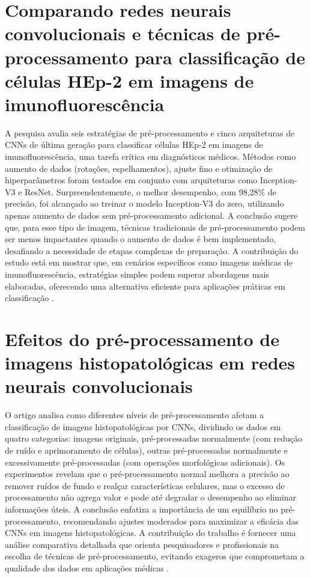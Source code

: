 \section{Comparando redes neurais convolucionais e técnicas de pré- processamento para classificação de células HEp-2 em imagens de imunofluorescência}
A pesquisa avalia seis estratégias de pré-processamento e cinco arquiteturas de CNNs de última geração para classificar células HEp-2 em imagens de imunofluorescência, uma tarefa crítica em diagnósticos médicos. Métodos como aumento de dados (rotações, espelhamentos), ajuste fino e otimização de hiperparâmetros foram testados em conjunto com arquiteturas como Inception-V3 e ResNet. Surpreendentemente, o melhor desempenho, com 98,28\% de precisão, foi alcançado ao treinar o modelo Inception-V3 do zero, utilizando apenas aumento de dados sem pré-processamento adicional. A conclusão sugere que, para esse tipo de imagem, técnicas tradicionais de pré-processamento podem ser menos impactantes quando o aumento de dados é bem implementado, desafiando a necessidade de etapas complexas de preparação. A contribuição do estudo está em mostrar que, em cenários específicos como imagens médicas de imunofluorescência, estratégias simples podem superar abordagens mais elaboradas, oferecendo uma alternativa eficiente para aplicações práticas em classificação \cite{rodrigues2020comparing}.

\section{Efeitos do pré-processamento de imagens histopatológicas em redes neurais convolucionais}
O artigo analisa como diferentes níveis de pré-processamento afetam a classificação de imagens histopatológicas por CNNs, dividindo os dados em quatro categorias: imagens originais, pré-processadas normalmente (com redução de ruído e aprimoramento de células), outras pré-processadas normalmente e excessivamente pré-processadas (com operações morfológicas adicionais). Os experimentos revelam que o pré-processamento normal melhora a precisão ao remover ruídos de fundo e realçar características celulares, mas o excesso de processamento não agrega valor e pode até degradar o desempenho ao eliminar informações úteis. A conclusão enfatiza a importância de um equilíbrio no pré-processamento, recomendando ajustes moderados para maximizar a eficácia das CNNs em imagens histopatológicas. A contribuição do trabalho é fornecer uma análise comparativa detalhada que orienta pesquisadores e profissionais na escolha de técnicas de pré-processamento, evitando exageros que comprometam a qualidade dos dados em aplicações médicas \cite{ozturk2018histopathological}.

